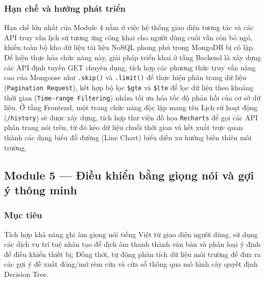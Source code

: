 \subsubsection{Hạn chế và hướng phát triển}
Hạn chế lớn nhất của Module 4 nằm ở việc hệ thống giao diện tương tác và các API truy vấn lịch sử tương ứng công khai cho người dùng cuối vẫn còn bỏ ngỏ, khiến toàn bộ kho dữ liệu tài liệu NoSQL phong phú trong MongoDB bị cô lập. Để hiện thực hóa chức năng này, giải pháp triển khai ở tầng Backend là xây dựng các API định tuyến GET chuyên dụng, tích hợp các phương thức truy vấn nâng cao của Mongoose như \texttt{.skip()} và \texttt{.limit()} để thực hiện phân trang dữ liệu (\texttt{Pagination Request}), kết hợp bộ lọc \texttt{\$gte} và \texttt{\$lte} để lọc dữ liệu theo khoảng thời gian (\texttt{Time-range Filtering}) nhằm tối ưu hóa tốc độ phản hồi của cơ sở dữ liệu. Ở tầng Frontend, một trang chức năng độc lập mang tên Lịch sử hoạt động (\texttt{/history}) sẽ được xây dựng, tích hợp thư viện đồ họa \texttt{Recharts} để gọi các API phân trang nói trên, từ đó kéo dữ liệu chuỗi thời gian và kết xuất trực quan thành các dạng biểu đồ đường (Line Chart) biểu diễn xu hướng biến thiên môi trường.

\subsection{Module 5 --- Điều khiển bằng giọng nói và gợi ý thông minh}

\subsubsection{Mục tiêu}
Tích hợp khả năng ghi âm giọng nói tiếng Việt từ giao diện người dùng, sử dụng các dịch vụ trí tuệ nhân tạo để dịch âm thanh thành văn bản và phân loại ý định để điều khiển thiết bị; Đồng thời, tự động phân tích dữ liệu môi trường để đưa ra các gợi ý đề xuất đóng/mở rèm cửa và cửa sổ thông qua mô hình cây quyết định Decision Tree.



